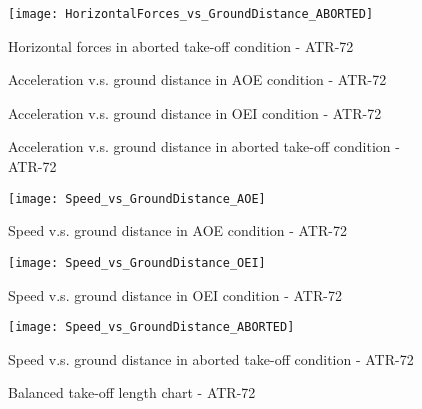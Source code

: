 %
\begin{figure}[H]
\centering
\texttt{[image: HorizontalForces\_vs\_GroundDistance\_ABORTED]}
\caption{Horizontal forces in aborted take-off condition - ATR-72}
\end{figure}
%
\begin{figure}[H]
\centering

\caption{Acceleration v.s. ground distance in AOE condition - ATR-72}
\end{figure}
%
\begin{figure}[H]
\centering

\caption{Acceleration v.s. ground distance in OEI condition - ATR-72}
\end{figure}
%
\begin{figure}[H]
\centering

\caption{Acceleration v.s. ground distance in aborted take-off condition - ATR-72}
\end{figure}
%
\begin{figure}[H]
\centering
\texttt{[image: Speed\_vs\_GroundDistance\_AOE]}
\caption{Speed v.s. ground distance in AOE condition - ATR-72}
\end{figure}
%
\begin{figure}[H]
\centering
\texttt{[image: Speed\_vs\_GroundDistance\_OEI]}
\caption{Speed v.s. ground distance in OEI condition - ATR-72}
\end{figure}
%
\begin{figure}[H]
\centering
\texttt{[image: Speed\_vs\_GroundDistance\_ABORTED]}
\caption{Speed v.s. ground distance in aborted take-off condition - ATR-72}
\end{figure}
%
\begin{figure}[H]
\centering

\caption{Balanced take-off length chart - ATR-72}
\end{figure}
%